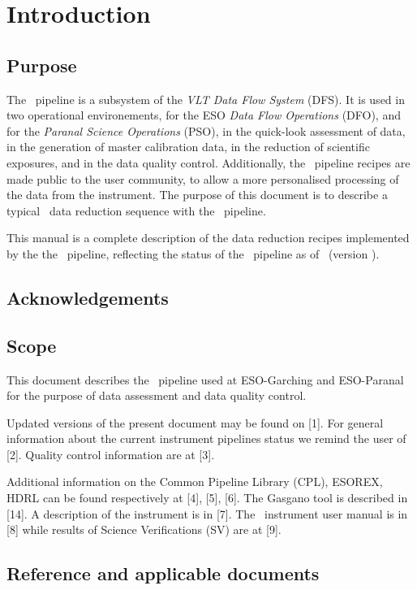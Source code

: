   
\section{Introduction}

\subsection{Purpose}

The \pipename\, pipeline is a subsystem of the 
{\it VLT Data Flow System} (DFS). It is used in two 
operational environements, for the ESO {\it Data Flow Operations} 
(DFO), and for the {\it Paranal Science Operations} (PSO), 
in the quick-look assessment of data, in the generation of master 
calibration data, in the reduction of scientific exposures, 
and in the data quality control. Additionally, the \pipename\, 
pipeline recipes are made public to the user community, to 
allow a more personalised processing of the data from the instrument. 
The purpose of this document is to describe a typical \pipename\, 
data reduction sequence with the \pipename\, pipeline.

This manual is a complete description of the data reduction recipes 
implemented by the the \pipename\, pipeline, reflecting the status 
of the \pipename\, pipeline as of \releasedate\, (version \pipelinevers).

\subsection{Acknowledgements}

\subsection{Scope}

This document describes the \pipename\, pipeline used at ESO-Garching
and ESO-Paranal for the purpose of data assessment and data quality
control. 

Updated versions of the present document may be found on [1].
For general information about the current instrument pipelines status we remind the user of [2].
Quality control information are at [3].

Additional information on the Common Pipeline Library (CPL), ESOREX, HDRL can be found 
respectively at [4], [5], [6]. The Gasgano tool is described in [14]. 
A description of the instrument is in [7]. 
The \pipename\, instrument user manual is in [8] 
while results of Science Verifications (SV) are at [9].

\subsection{Reference and applicable documents}

%

